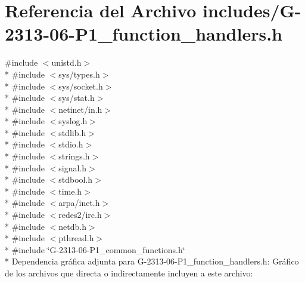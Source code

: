 \hypertarget{G-2313-06-P1__function__handlers_8h}{}\section{Referencia del Archivo includes/\+G-\/2313-\/06-\/\+P1\+\_\+function\+\_\+handlers.h}
\label{G-2313-06-P1__function__handlers_8h}
{\ttfamily \#include $<$unistd.\+h$>$}\\*
{\ttfamily \#include $<$sys/types.\+h$>$}\\*
{\ttfamily \#include $<$sys/socket.\+h$>$}\\*
{\ttfamily \#include $<$sys/stat.\+h$>$}\\*
{\ttfamily \#include $<$netinet/in.\+h$>$}\\*
{\ttfamily \#include $<$syslog.\+h$>$}\\*
{\ttfamily \#include $<$stdlib.\+h$>$}\\*
{\ttfamily \#include $<$stdio.\+h$>$}\\*
{\ttfamily \#include $<$strings.\+h$>$}\\*
{\ttfamily \#include $<$signal.\+h$>$}\\*
{\ttfamily \#include $<$stdbool.\+h$>$}\\*
{\ttfamily \#include $<$time.\+h$>$}\\*
{\ttfamily \#include $<$arpa/inet.\+h$>$}\\*
{\ttfamily \#include $<$redes2/irc.\+h$>$}\\*
{\ttfamily \#include $<$netdb.\+h$>$}\\*
{\ttfamily \#include $<$pthread.\+h$>$}\\*
{\ttfamily \#include \char`\"{}G-\/2313-\/06-\/\+P1\+\_\+common\+\_\+functions.\+h\char`\"{}}\\*
Dependencia gráfica adjunta para G-\/2313-\/06-\/\+P1\+\_\+function\+\_\+handlers.h\+:
Gráfico de los archivos que directa o indirectamente incluyen a este archivo\+:
